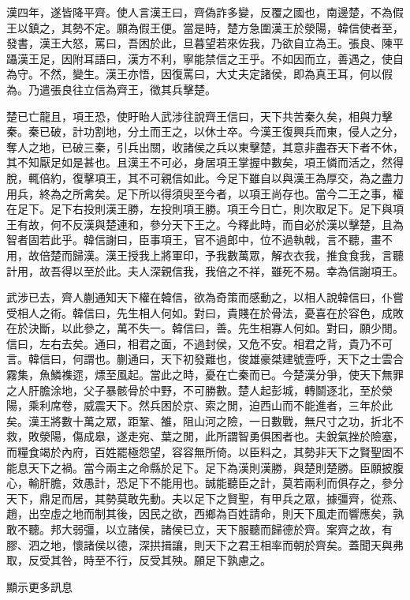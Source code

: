 漢四年，遂皆降平齊。使人言漢王曰，齊偽詐多變，反覆之國也，南邊楚，不為假王以鎮之，其勢不定。願為假王便。當是時，楚方急圍漢王於滎陽，韓信使者至，發書，漢王大怒，罵曰，吾困於此，旦暮望若來佐我，乃欲自立為王。張良、陳平躡漢王足，因附耳語曰，漢方不利，寧能禁信之王乎。不如因而立，善遇之，使自為守。不然，變生。漢王亦悟，因復罵曰，大丈夫定諸侯，即為真王耳，何以假為。乃遣張良往立信為齊王，徵其兵擊楚。

楚已亡龍且，項王恐，使盱眙人武涉往說齊王信曰，天下共苦秦久矣，相與力擊秦。秦已破，計功割地，分土而王之，以休士卒。今漢王復興兵而東，侵人之分，奪人之地，已破三秦，引兵出關，收諸侯之兵以東擊楚，其意非盡吞天下者不休，其不知厭足如是甚也。且漢王不可必，身居項王掌握中數矣，項王憐而活之，然得脫，輒倍約，復擊項王，其不可親信如此。今足下雖自以與漢王為厚交，為之盡力用兵，終為之所禽矣。足下所以得須臾至今者，以項王尚存也。當今二王之事，權在足下。足下右投則漢王勝，左投則項王勝。項王今日亡，則次取足下。足下與項王有故，何不反漢與楚連和，參分天下王之。今釋此時，而自必於漢以擊楚，且為智者固若此乎。韓信謝曰，臣事項王，官不過郎中，位不過執戟，言不聽，畫不用，故倍楚而歸漢。漢王授我上將軍印，予我數萬眾，解衣衣我，推食食我，言聽計用，故吾得以至於此。夫人深親信我，我倍之不祥，雖死不易。幸為信謝項王。

武涉已去，齊人蒯通知天下權在韓信，欲為奇策而感動之，以相人說韓信曰，仆嘗受相人之術。韓信曰，先生相人何如。對曰，貴賤在於骨法，憂喜在於容色，成敗在於決斷，以此參之，萬不失一。韓信曰，善。先生相寡人何如。對曰，願少閒。信曰，左右去矣。通曰，相君之面，不過封侯，又危不安。相君之背，貴乃不可言。韓信曰，何謂也。蒯通曰，天下初發難也，俊雄豪桀建號壹呼，天下之士雲合霧集，魚鱗襍遝，熛至風起。當此之時，憂在亡秦而已。今楚漢分爭，使天下無罪之人肝膽涂地，父子暴骸骨於中野，不可勝數。楚人起彭城，轉鬬逐北，至於滎陽，乘利席卷，威震天下。然兵困於京、索之閒，迫西山而不能進者，三年於此矣。漢王將數十萬之眾，距鞏、雒，阻山河之險，一日數戰，無尺寸之功，折北不救，敗滎陽，傷成皋，遂走宛、葉之閒，此所謂智勇俱困者也。夫銳氣挫於險塞，而糧食竭於內府，百姓罷極怨望，容容無所倚。以臣料之，其勢非天下之賢聖固不能息天下之禍。當今兩主之命縣於足下。足下為漢則漢勝，與楚則楚勝。臣願披腹心，輸肝膽，效愚計，恐足下不能用也。誠能聽臣之計，莫若兩利而俱存之，參分天下，鼎足而居，其勢莫敢先動。夫以足下之賢聖，有甲兵之眾，據彊齊，從燕、趙，出空虛之地而制其後，因民之欲，西鄉為百姓請命，則天下風走而響應矣，孰敢不聽。邦大弱彊，以立諸侯，諸侯已立，天下服聽而歸德於齊。案齊之故，有膠、泗之地，懷諸侯以德，深拱揖讓，則天下之君王相率而朝於齊矣。蓋聞天與弗取，反受其咎，時至不行，反受其殃。願足下孰慮之。

顯示更多訊息

